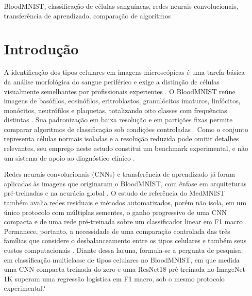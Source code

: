 \documentclass[conference]{IEEEtran}
\begin{document}
\begin{IEEEkeywords}
BloodMNIST, classificação de células sanguíneas, redes neurais convolucionais, transferência de aprendizado, comparação de algoritmos
\end{IEEEkeywords}

\section{Introdução}
\label{sec:introducao}

A identificação dos tipos celulares em imagens microscópicas é uma tarefa básica da análise morfológica do sangue periférico e exige a distinção de células visualmente semelhantes por profissionais experientes \cite{acevedo2019recognition,acevedo2020dataset}.
O BloodMNIST reúne imagens de basófilos, eosinófilos, eritroblastos, granulócitos imaturos, linfócitos, monócitos, neutrófilos e plaquetas, totalizando oito classes com frequências distintas \cite{acevedo2020dataset,yang2023medmnist}.
Sua padronização em baixa resolução e em partições fixas permite comparar algoritmos de classificação sob condições controladas \cite{yang2023medmnist}.
Como o conjunto representa células normais isoladas e a resolução reduzida pode omitir detalhes relevantes, seu emprego neste estudo constitui um benchmark experimental, e não um sistema de apoio ao diagnóstico clínico \cite{acevedo2020dataset,yang2023medmnist}.

Redes neurais convolucionais (CNNs) e transferência de aprendizado já foram aplicadas às imagens que originaram o BloodMNIST, com ênfase em arquiteturas pré-treinadas e na acurácia global \cite{acevedo2019recognition,gavas2021deep}.
O estudo de referência do MedMNIST também avalia redes residuais e métodos automatizados, porém não isola, em um único protocolo com múltiplas sementes, o ganho progressivo de uma CNN compacta e de uma rede pré-treinada sobre um classificador linear em F1 macro \cite{yang2023medmnist}.
Permanece, portanto, a necessidade de uma comparação controlada das três famílias que considere o desbalanceamento entre os tipos celulares e também seus custos computacionais \cite{acevedo2020dataset,yang2023medmnist}.
Diante dessa lacuna, formula-se a pergunta de pesquisa: em classificação multiclasse de tipos celulares no BloodMNIST, em que medida uma CNN compacta treinada do zero e uma ResNet18 pré-treinada no ImageNet-1K superam uma regressão logística em F1 macro, sob o mesmo protocolo experimental?
\end{document}
